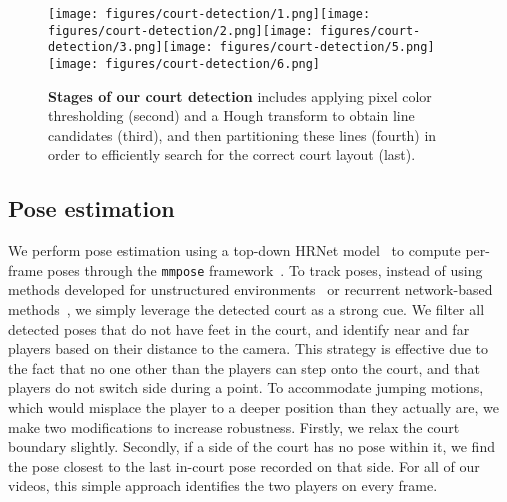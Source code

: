 \begin{figure*}[ht]
\texttt{[image: figures/court-detection/1.png]}\linebreak[0]
\texttt{[image: figures/court-detection/2.png]}\linebreak[0]
\texttt{[image: figures/court-detection/3.png]}\linebreak[0]
\texttt{[image: figures/court-detection/5.png]}\linebreak[0]
\texttt{[image: figures/court-detection/6.png]}\linebreak[0]
\caption{{\bf Stages of our court detection} includes applying pixel color thresholding (second) and a Hough transform to obtain line candidates (third), and then partitioning these lines (fourth) in order to efficiently search for the correct court layout (last). \label{fig:court-detect}}
\end{figure*}









\subsection{Pose estimation}
\label{sec:pose-estimation}
We perform pose estimation using a top-down HRNet model~\cite{hrnet} to compute per-frame poses through the {\tt mmpose} framework~\cite{mmpose}. To track poses, instead of using methods developed for unstructured environments~\cite{girdhar_detect-and-track_2018} or recurrent network-based methods~\cite{sadeghian_tracking_2017}, we simply leverage the detected court as a strong cue. We filter all detected poses that do not have feet in the court, and identify near and far players based on their distance to the camera. This strategy is effective due to the fact that no one other than the players can step onto the court, and that players do not switch side during a point. To accommodate jumping motions, which would misplace the player to a deeper position than they actually are, we make two modifications to increase robustness. Firstly, we relax the court boundary slightly. Secondly, if a side of the court has no pose within it, we find the pose closest to the last in-court pose recorded on that side. For all of our videos, this simple approach identifies the two players on every frame.



